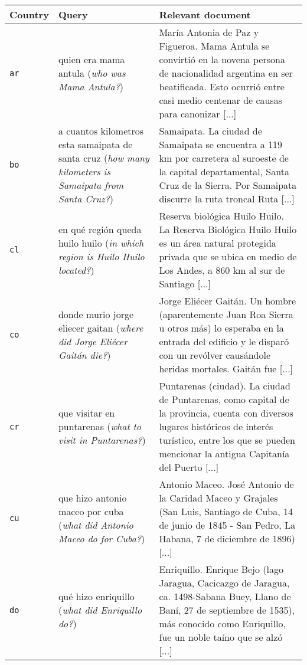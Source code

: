 \begin{tabularx}{\textwidth}{%
  >{\centering\arraybackslash}m{} 
  >{\centering\arraybackslash}m{} 
  >{\scriptsize\raggedright\arraybackslash}m{}
}

\toprule
\textbf{Country} & \textbf{Query} & \textbf{Relevant document} \\
\midrule
\midrule
\texttt{ar} & quien era mama antula (\emph{who was Mama Antula?}) & María Antonia de Paz y Figueroa. Mama Antula se convirtió en la novena persona de nacionalidad argentina en ser beatificada. Esto ocurrió entre casi medio centenar de causas para canonizar [...] \\ 
\midrule
\texttt{bo} & a cuantos kilometros esta samaipata de santa cruz (\emph{how many kilometers is Samaipata from Santa Cruz?}) & Samaipata. La ciudad de Samaipata se encuentra a 119 km por carretera al suroeste de la capital departamental, Santa Cruz de la Sierra. Por Samaipata discurre la ruta troncal Ruta [...] \\ 
\midrule
\texttt{cl} & en qué región queda huilo huilo (\emph{in which region is Huilo Huilo located?}) & Reserva biológica Huilo Huilo. La Reserva Biológica Huilo Huilo es un área natural protegida privada que se ubica en medio de Los Andes, a 860 km al sur de Santiago [...] \\ 
\midrule
\texttt{co} & donde murio jorge eliecer gaitan (\emph{where did Jorge Eliécer Gaitán die?}) & Jorge Eliécer Gaitán. Un hombre (aparentemente Juan Roa Sierra u otros más) lo esperaba en la entrada del edificio y le disparó con un revólver causándole heridas mortales. Gaitán fue [...] \\ 
\midrule
\texttt{cr} & que visitar en puntarenas (\emph{what to visit in Puntarenas?}) & Puntarenas (ciudad). La ciudad de Puntarenas, como capital de la provincia, cuenta con diversos lugares históricos de interés turístico, entre los que se pueden mencionar la antigua Capitanía del Puerto [...] \\ 
\midrule
\texttt{cu} & que hizo antonio maceo por cuba (\emph{what did Antonio Maceo do for Cuba?}) & Antonio Maceo. José Antonio de la Caridad Maceo y Grajales (San Luis, Santiago de Cuba, 14 de junio de 1845 - San Pedro, La Habana, 7 de diciembre de 1896) [...] \\ 
\midrule
\texttt{do} & qué hizo enriquillo (\emph{what did Enriquillo do?}) & Enriquillo. Enrique Bejo (lago Jaragua, Cacicazgo de Jaragua, ca. 1498-Sabana Buey, Llano de Baní, 27 de septiembre de 1535), más conocido como Enriquillo, fue un noble taíno que se alzó [...] \\ 

\end{tabularx}
